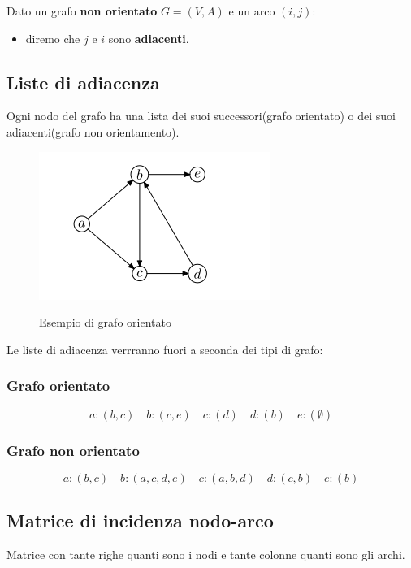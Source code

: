 Dato un grafo \textbf{non orientato} $G = (V, A)$ e un arco $(i, j)$:
\begin{itemize}
    \item diremo che $j$ e $i$ sono \textbf{adiacenti}.
\end{itemize}

\subsection{Liste di adiacenza}

Ogni nodo del grafo ha una lista dei suoi successori(grafo orientato) o dei suoi adiacenti(grafo non orientamento).
\begin{figure}[h!]
    \centering
    \includegraphics[width=0.4\linewidth]{img/Screenshot from 2022-05-31 15-50-09.png}
    \label{fig:example_graph}
    \caption{Esempio di grafo orientato}
\end{figure}

Le liste di adiacenza verrranno fuori a seconda dei tipi di grafo:

\subsubsection{Grafo orientato}
\begin{equation*}
    a: (b, c)\quad b: (c, e)\quad c: (d)\quad d: (b)\quad e: (\emptyset)
\end{equation*}
\subsubsection{Grafo non orientato}
\begin{equation*}
    a: (b, c)\quad b: (a, c, d, e)\quad c: (a, b, d)\quad d: (c, b)\quad e: (b)
\end{equation*}

\subsection{Matrice di incidenza nodo-arco}
Matrice con tante righe quanti sono i nodi e tante colonne quanti sono gli archi.

